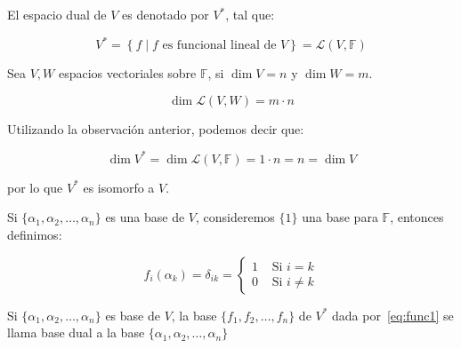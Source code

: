 		\begin{definicion}
			El espacio dual de $V$ es denotado por $V^*$, tal que:

			\begin{equation}
				V^* = \left\{ f \mid f \text{ es funcional lineal de } V \right\} = \mathcal{L}(V, \mathbb{F})
			\end{equation}
		\end{definicion}

		\begin{observacion}
			Sea $V, W$ espacios vectoriales sobre $\mathbb{F}$, si $\dim{V} = n$ y $\dim{W} = m$.

			\begin{equation}
				\dim{\mathcal{L}(V, W)} = m \cdot n
			\end{equation}
		\end{observacion}

		\begin{observacion}
			Utilizando la observación anterior, podemos decir que:

			\begin{equation} 
				\dim{V^*} = \dim{\mathcal{L}(V, \mathbb{F})} = 1 \cdot n = n = \dim{V}
			\end{equation}

			por lo que $V^*$ es isomorfo a $V$.
		\end{observacion}

		\begin{definicion}
			Si $\{ \alpha_1, \alpha_2, \dots, \alpha_n \}$ es una base de $V$, consideremos $\{1\}$ una base para $\mathbb{F}$, entonces definimos:

			\begin{equation} \label{eq:func1}
				f_i(\alpha_k) = \delta_{ik} =
				\begin{cases}
					1 & \text{ Si } i = k \\
					0 & \text{ Si } i \ne k
				\end{cases}
			\end{equation}
		\end{definicion}

		\begin{definicion}
			Si $\{ \alpha_1, \alpha_2, \dots, \alpha_n \}$ es base de $V$, la base $\{ f_1, f_2, \dots, f_n \}$ de $V^*$ dada por~\ref{eq:func1} se llama base dual a la base $\{ \alpha_1, \alpha_2, \dots, \alpha_n \}$
		\end{definicion}

		\begin{ejemplo}
		\end{ejemplo}

